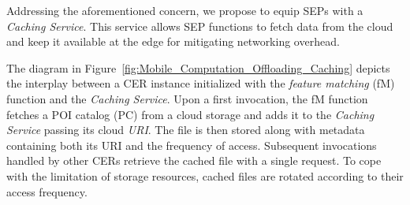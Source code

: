 Addressing the aforementioned concern, we propose to equip SEPs with a \textit{Caching Service}. This service allows SEP functions to fetch data from the cloud and keep it available at the edge for mitigating networking overhead. 



The diagram in Figure~\ref{fig:Mobile_Computation_Offloading_Caching} depicts the interplay between a CER instance initialized with the \textit{feature matching} (fM) function and the \textit{Caching Service}.
Upon a first invocation, the fM function fetches a POI catalog (PC) from a cloud storage and adds it to the \textit{Caching Service} passing its cloud \textit{URI}. 
The file is then stored along with metadata containing both its URI and the frequency of access.
Subsequent invocations handled by other CERs retrieve the cached file with a single request.
To cope with the limitation of storage resources, cached files are rotated according to their access frequency. %
